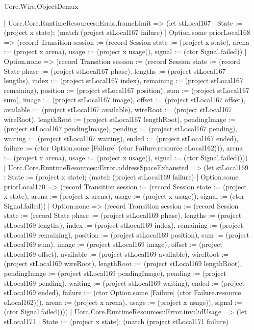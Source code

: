 \begin{lexlean}{Uorc.Wire.ObjectDemux}
\begin{semanticmodule}
{      | Uorc.Core.RuntimeResources::Error.frameLimit => (let stLocal167 : State := (project x state); (match (project stLocal167 failure)
        | Option.some priorLocal168 => (record Transition {session := (record Session {state := (project x state), arena := (project x arena), usage := (project x usage)}), signal := (ctor Signal.failed)})
        | Option.none => (record Transition {session := (record Session {state := (record State {phase := (project stLocal167 phase), lengths := (project stLocal167 lengths), index := (project stLocal167 index), remaining := (project stLocal167 remaining), position := (project stLocal167 position), sum := (project stLocal167 sum), image := (project stLocal167 image), offset := (project stLocal167 offset), available := (project stLocal167 available), wireRoot := (project stLocal167 wireRoot), lengthRoot := (project stLocal167 lengthRoot), pendingImage := (project stLocal167 pendingImage), pending := (project stLocal167 pending), waiting := (project stLocal167 waiting), ended := (project stLocal167 ended), failure := (ctor Option.some [Failure] (ctor Failure.resource eLocal162))}), arena := (project x arena), usage := (project x usage)}), signal := (ctor Signal.failed)})))
      | Uorc.Core.RuntimeResources::Error.addressSpaceExhausted => (let stLocal169 : State := (project x state); (match (project stLocal169 failure)
        | Option.some priorLocal170 => (record Transition {session := (record Session {state := (project x state), arena := (project x arena), usage := (project x usage)}), signal := (ctor Signal.failed)})
        | Option.none => (record Transition {session := (record Session {state := (record State {phase := (project stLocal169 phase), lengths := (project stLocal169 lengths), index := (project stLocal169 index), remaining := (project stLocal169 remaining), position := (project stLocal169 position), sum := (project stLocal169 sum), image := (project stLocal169 image), offset := (project stLocal169 offset), available := (project stLocal169 available), wireRoot := (project stLocal169 wireRoot), lengthRoot := (project stLocal169 lengthRoot), pendingImage := (project stLocal169 pendingImage), pending := (project stLocal169 pending), waiting := (project stLocal169 waiting), ended := (project stLocal169 ended), failure := (ctor Option.some [Failure] (ctor Failure.resource eLocal162))}), arena := (project x arena), usage := (project x usage)}), signal := (ctor Signal.failed)})))
      | Uorc.Core.RuntimeResources::Error.invalidUsage => (let stLocal171 : State := (project x state); (match (project stLocal171 failure)
}
\end{semanticmodule}
\end{lexlean}
